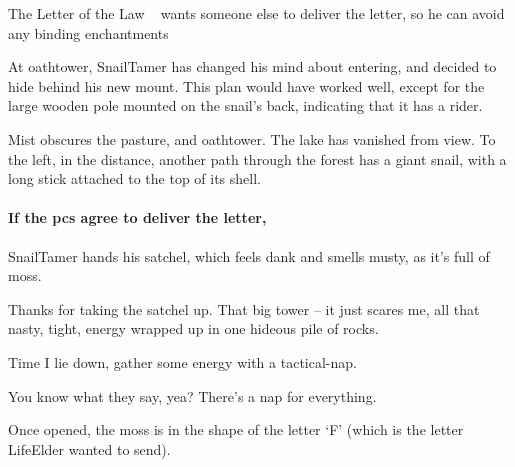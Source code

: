 {The Letter of the Law}%
{~ wants someone else to deliver the letter, so he can avoid any binding enchantments}%

At \gls{oathtower}, \gls{SnailTamer} has changed his mind about entering, and decided to hide behind his new mount.
This plan would have worked well, except for the large wooden pole mounted on the snail's back, indicating that it has a rider.

\begin{boxtext}
  Mist obscures the pasture, and \gls{oathtower}.
  The lake has vanished from view.
  To the left, in the distance, another path through the forest has a giant snail, with a long stick attached to the top of its shell.
\end{boxtext}

\paragraph{If the \glspl{pc} agree to deliver the letter,}
\gls{SnailTamer} hands his satchel, which feels dank and smells musty, as it's full of moss.

\begin{speechtext}
  Thanks for taking the satchel up.
  That big tower -- it just scares me, all that nasty, tight, energy wrapped up in one hideous pile of rocks.

  Time I lie down, gather some energy with a tactical-nap.

  You know what they say, yea?
  There's a nap for everything.
\end{speechtext}

Once opened, the moss is in the shape of the letter `F' (which is the letter \gls{LifeElder} wanted to send).


